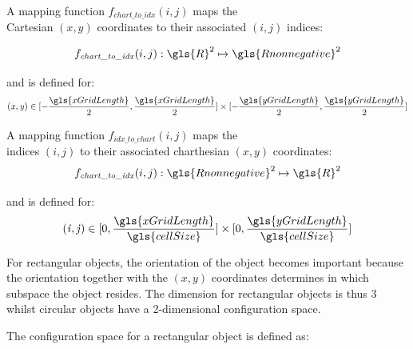 A mapping function $f_\mathit{chart\_to\_idx}(i,j)$ maps the\\Cartesian $(x,y)$ coordinates to their associated $(i,j)$ indices:

\[f_\mathit{chart\_to\_idx}(i,j): \gls{R}^2 \mapsto \gls{Rnonnegative}^2 \]

and is defined for: 
\[ \mathit{(x, y)} \in [-\frac{\gls{xGridLength}}{2}, \frac{\gls{xGridLength}}{2}] \times [-\frac{\gls{yGridLength}}{2}, \frac{\gls{yGridLength}}{2}]\]

A mapping function $f_\mathit{idx\_to\_chart}(i, j)$ maps the\\indices $(i, j)$ to their associated charthesian $(x,y)$ coordinates:
\[f_\mathit{chart\_to\_idx}(i,j): \gls{Rnonnegative}^2  \mapsto \gls{R}^2 \]

and is defined for:
\[ \mathit{(i, j)} \in [0, \frac{\gls{xGridLength}}{\gls{cellSize}}] \times [0, \frac{\gls{yGridLength}}{\gls{cellSize}}]\]

For rectangular objects, the orientation of the object becomes important because the orientation together with the $\mathit{(x, y)}$ coordinates determines in which subspace the object resides. The dimension for rectangular objects is thus 3 whilst circular objects have a 2-dimensional configuration space.\bs

The configuration space for a rectangular object is defined as:\bs


